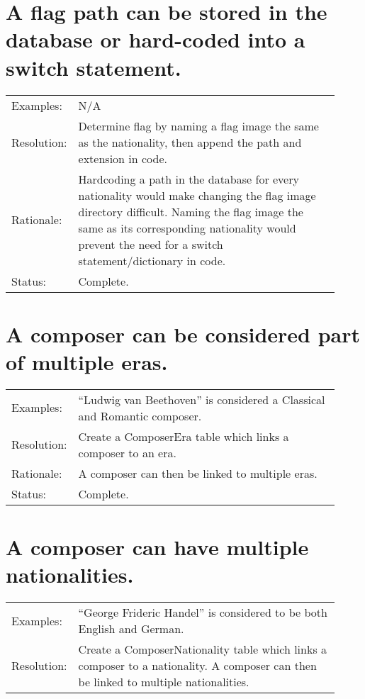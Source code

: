\documentclass[letterpaper]{report}
\begin{document}
\section{A flag path can be stored in the database or hard-coded into a switch statement.}

\begin{tabular}{ p{0.1\linewidth} p{0.825\linewidth} }
  Examples: & N/A \\ 
  Resolution: & Determine flag by naming a flag image the same as the nationality, then append the path and extension in code. \\
  Rationale: & Hardcoding a path in the database for every nationality would make changing the flag image directory difficult. Naming the flag image the same as its corresponding nationality would prevent the need for a switch statement/dictionary in code. \\
  Status: & Complete.
\end{tabular}

\section{A composer can be considered part of multiple eras.}

\begin{tabular}{ p{0.1\linewidth} p{0.825\linewidth} }
  Examples: & ``Ludwig van Beethoven'' is considered a Classical and Romantic composer. \\ 
  Resolution: & Create a ComposerEra table which links a composer to an era. \\
  Rationale: & A composer can then be linked to multiple eras. \\
  Status: & Complete.
\end{tabular}

\section{A composer can have multiple nationalities.}

\begin{tabular}{ p{0.1\linewidth} p{0.825\linewidth} }

Examples: & 

``George Frideric Handel'' is considered to be both English and German. \\ 
  
Resolution: & 

Create a ComposerNationality table which links a composer to a nationality. A composer can then be linked to multiple nationalities. \\
  
\end{tabular}
\end{document}
